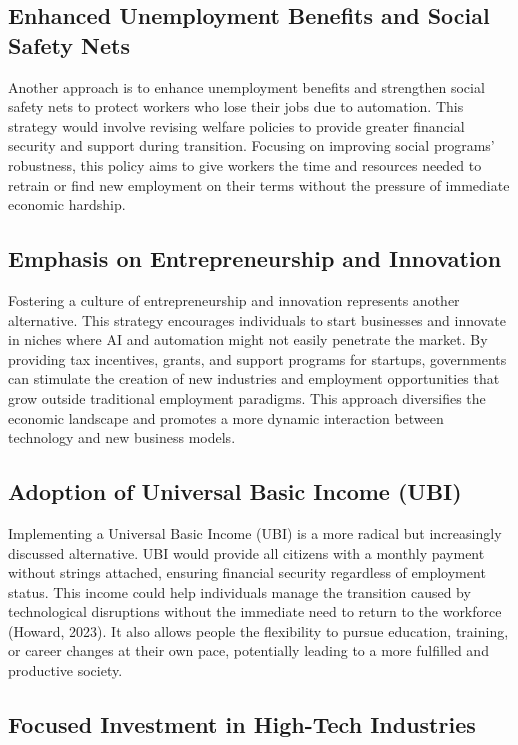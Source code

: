 \documentclass[11pt]{article}
\begin{document}
\subsection{Enhanced Unemployment Benefits and Social Safety Nets}

Another approach is to enhance unemployment benefits and strengthen social safety nets to protect workers who lose their jobs due to automation. This strategy would involve revising welfare policies to provide greater financial security and support during transition. Focusing on improving social programs' robustness, this policy aims to give workers the time and resources needed to retrain or find new employment on their terms without the pressure of immediate economic hardship.

\subsection{Emphasis on Entrepreneurship and Innovation}

Fostering a culture of entrepreneurship and innovation represents another alternative. This strategy encourages individuals to start businesses and innovate in niches where AI and automation might not easily penetrate the market. By providing tax incentives, grants, and support programs for startups, governments can stimulate the creation of new industries and employment opportunities that grow outside traditional employment paradigms. This approach diversifies the economic landscape and promotes a more dynamic interaction between technology and new business models.

\subsection{Adoption of Universal Basic Income (UBI)}

Implementing a Universal Basic Income (UBI) is a more radical but increasingly discussed alternative. UBI would provide all citizens with a monthly payment without strings attached, ensuring financial security regardless of employment status. This income could help individuals manage the transition caused by technological disruptions without the immediate need to return to the workforce (Howard, 2023). It also allows people the flexibility to pursue education, training, or career changes at their own pace, potentially leading to a more fulfilled and productive society.

\subsection{Focused Investment in High-Tech Industries}
\end{document}
